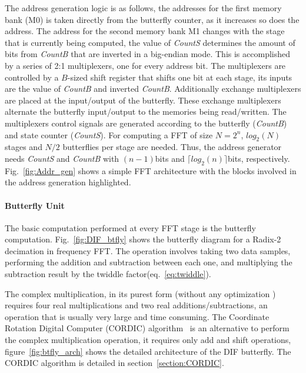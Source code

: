 The address generation logic is as follows, the addresses for the first memory bank (M0) is taken directly from the butterfly counter, as it increases so does the address. The address for the second memory bank M1 changes with the stage that is 
currently being computed, the value
of \textit{CountS} determines the amount of bits from \textit{CountB} that
are inverted in a big-endian mode. This is accomplished by a series of 2:1 
multiplexers, one for every address bit. 
The multiplexers are controlled by a $B$-sized shift register that shifts one bit at each stage, its inputs are the value of \textit{CountB} and inverted \textit{CountB}. Additionally exchange multiplexers are placed at the input/output of the butterfly. These exchange multiplexers alternate the butterfly input/output to the memories being read/written. The multiplexers control signals are generated according to the butterfly (\textit{CountB}) and state counter (\textit{CountS}). 
For computing a FFT of size $N = 2^n$, $log_2(N)$ stages and $N/2$ 
butterflies per stage are needed. Thus, the address generator 
needs \textit{CountS} and \textit{CountB} with $(n-1)$bits and $\lceil log_2(n) \rceil$bits, respectively. Fig.~\ref{fig:Addr_gen} shows a simple FFT architecture with the blocks involved in the address generation highlighted.

\paragraph{Butterfly Unit}

The basic computation performed at every FFT stage is the butterfly computation. Fig.~\ref{fig:DIF_btfly} shows the  butterfly diagram for a Radix-2 decimation in frequency FFT.  The operation involves taking two data samples, performing the addition and subtraction between each one, and multiplying the subtraction result by the twiddle factor(eq.~\ref{eq:twiddle}).

The complex multiplication, in its purest form (without any optimization \cite{bib:chu_black_box})  requires four real multiplications and two real additions/subtractions, an operation that is usually very large and time consuming. The Coordinate Rotation Digital Computer (CORDIC) 
algorithm~\cite{voider1959} is an alternative to perform the complex multiplication operation, it requires only
add and shift operations, figure~\ref{fig:btfly_arch} shows the detailed architecture of the DIF butterfly. The CORDIC algorithm is detailed in section~\ref{section:CORDIC}.

